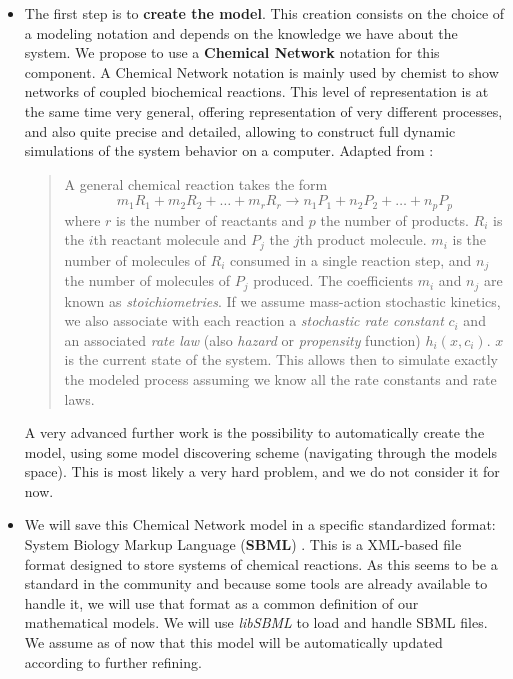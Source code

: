 \documentclass[letterpaper, oneside]{article}
\begin{document}
\begin{itemize}
	\item The first step is to \textbf{create the model}. This creation consists on the choice of a modeling notation and depends on the knowledge we have about the system. We propose to use a \textbf{Chemical Network} notation for this component. A Chemical Network notation is mainly used by chemist to show networks of coupled biochemical reactions. This level of representation is at the same time very general, offering representation of very different processes, and also quite precise and detailed, allowing to construct full dynamic simulations of the system behavior on a computer.
	Adapted from \cite{Wilkinson:2006yg}:
	
	\begin{quote}
		A general chemical reaction takes the form
		\[
			m_1 R_1 + m_2 R_2 + \ldots + m_r R_r \xrightarrow{} n_1 P_1 + n_2 P_2 + \ldots + n_p P_p
		\]
		where $r$ is the number of reactants and $p$ the number of products. $R_i$ is the $i$th reactant molecule and $P_j$ the $j$th product molecule. $m_i$ is the number of molecules of $R_i$ consumed in a single reaction step, and $n_j$ the number of molecules of $P_j$ produced. The coefficients $m_i$ and $n_j$ are known as \emph{stoichiometries}. If we assume mass-action stochastic kinetics, we also associate with each reaction a \emph{stochastic rate constant} $c_i$ and an associated \emph{rate law} (also \emph{hazard} or \emph{propensity} function) $h_i(x,c_i)$. $x$ is the current state of the system.
		This allows then to simulate exactly the modeled process assuming we know all the rate constants and rate laws.
	\end{quote}
	A very advanced further work is the possibility to automatically create the model, using some model discovering scheme (navigating through the models space). This is most likely a very hard problem, and we do not consider it for now.
	\item We will save this Chemical Network model in a specific standardized format: System Biology Markup Language (\textbf{SBML}) \cite{Hucka:2003qd}. This is a XML-based file format designed to store systems of chemical reactions. As this seems to be a standard in the community and because some tools are already available to handle it, we will use that format as a common definition of our mathematical models. We will use \emph{libSBML} \cite{Bornstein:2008hl} to load and handle SBML files. We assume as of now that this model will be automatically updated according to further refining.

\end{itemize}
\end{document}
